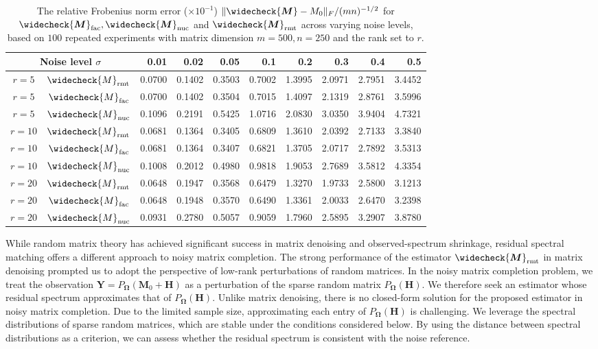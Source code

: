 \documentclass[numsec,webpdf,modern,large,namedate]{oup-authoring-template}
\theoremstyle{plain}
\theoremstyle{remark}
\newcommand{\M}{\bm{M}}
\newcommand{\bH}{\bm{H}}
\newcommand{\Y}{\bm{Y}}
\newcommand{\bOmega}{\bm{\Omega}}
\begin{document}
\begin{table}[htbp!]
\centering
    \caption{The relative Frobenius norm error ($\times 10^{-1}$) $\|\widecheck{\M}-M_0\|_{F}/(mn)^{-1/2}$ for $\widecheck{\M}_{\text{fac}},\widecheck{\M}_{\text{nuc}}$ and $\widecheck{\M}_{\text{rmt}}$ across varying noise levels, based on $100$ repeated experiments with matrix dimension $m=500,n=250$ and the rank set to $r$.}
    \label{tab:denoise_model}
    \begin{tabular}{ccrrrrrrrr}
		\toprule[1pt]
		\multicolumn{2}{c}{Noise level $\sigma$}&0.01 & 0.02&0.05&  0.1 & 0.2 &0.3 & 0.4 & 0.5  \\
    \midrule[1pt]
    $r=5$ &$\widecheck{M}_{\text{rmt}}$ & 0.0700&0.1402&0.3503&0.7002& 1.3995& 2.0971& 2.7951& 3.4452\\
    $r=5$ &$\widecheck{M}_{\text{fac}}$ & 0.0700& 0.1402&0.3504& 0.7015& 1.4097& 2.1319& 2.8761& 3.5996\\
    $r=5$ &$\widecheck{M}_{\text{nuc}}$ &  0.1096& 0.2191&0.5425& 1.0716 &2.0830&3.0350& 3.9404&4.7321\\
    \hline
    \hline
    $r=10$ &$\widecheck{M}_{\text{rmt}}$ &0.0681& 0.1364& 0.3405&0.6809&1.3610&2.0392&2.7133& 3.3840\\
    $r=10$ &$\widecheck{M}_{\text{fac}}$ & 0.0681&0.1364& 0.3407& 0.6821& 1.3705& 2.0717 &2.7892& 3.5313\\
    $r=10$ &$\widecheck{M}_{\text{nuc}}$ & 0.1008& 0.2012& 0.4980&0.9818&1.9053&2.7689& 3.5812& 4.3354\\
    \hline
    \hline
    $r=20$ &$\widecheck{M}_{\text{rmt}}$ &0.0648& 0.1947& 0.3568& 0.6479&1.3270& 1.9733&2.5800& 3.1213 \\
    $r=20$ &$\widecheck{M}_{\text{fac}}$ &  0.0648& 0.1948 &0.3570& 0.6490&1.3361& 2.0033& 2.6470& 3.2398 \\
    $r=20$ &$\widecheck{M}_{\text{nuc}}$ &0.0931& 0.2780& 0.5057& 0.9059& 1.7960& 2.5895&3.2907& 3.8780\\
    \bottomrule[1pt]
    	\end{tabular}
\end{table}

While random matrix theory has achieved significant success in matrix denoising and observed-spectrum shrinkage, residual spectral matching offers a different approach to noisy matrix completion.
The strong performance of the estimator $\widecheck{\M}_{\text{rmt}}$ in matrix denoising prompted us to adopt the perspective of low-rank perturbations of random matrices. In the noisy matrix completion problem, we treat the observation $\Y=P_{\bOmega}(\M_0+\bH)$ as a perturbation of the sparse random matrix $P_{\bOmega}(\bH)$. We therefore seek an estimator whose residual spectrum approximates that of $P_{\bOmega}(\bH)$. Unlike matrix denoising, there is no closed-form solution for the proposed estimator in noisy matrix completion. Due to the limited sample size, approximating each entry of $P_{\bOmega}(\bH)$ is challenging. We leverage the spectral distributions of sparse random matrices, which are stable under the conditions considered below. By using the distance between spectral distributions as a criterion, we can assess whether the residual spectrum is consistent with the noise reference.
\end{document}
